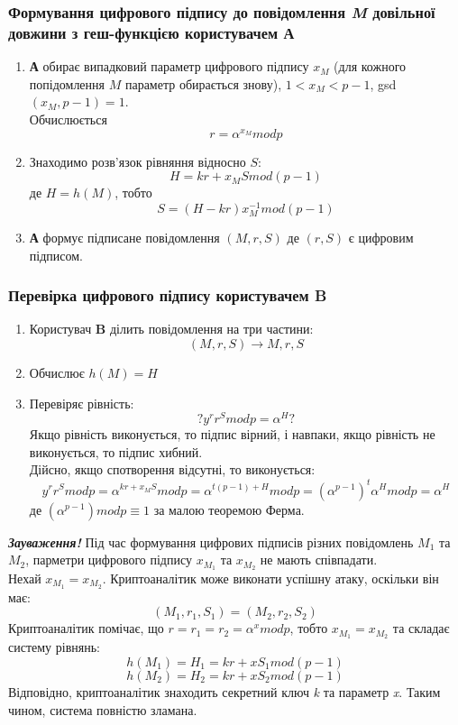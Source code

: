\subsubsection*{Формування цифрового підпису до повідомлення \textit{M} довільної довжини з геш-функцією користувачем \textbf{А}}
\begin{enumerate}
\item \textbf{А} обирає випадковий параметр цифрового підпису \textit{$x_M$} (для кожного попідомлення \textit{$M$} параметр обирається знову), $1<x_M<p-1$, gsd$(x_M,p-1)=1$.\\
 Обчислюється $$r=\alpha^{x_M}modp$$
\item Знаходимо розв'язок рівняння відносно \textit{$S$}: $$H=kr+x_{M}Smod(p-1)$$ 
де $H=h(M)$, тобто $$S=(H-kr)x^{-1}_{M}mod(p-1)$$ 
\item \textbf{А} формує підписане повідомлення \textit{$(M,r,S)$} де \textit{$(r,S)$} є цифровим підписом.
\end{enumerate}
\subsubsection*{Перевірка цифрового підпису користувачем \textbf{B}}
\begin{enumerate}
\item Користувач \textbf{B} ділить повідомлення на три частини:$$(M,r,S)\rightarrow M,r,S$$
\item Обчислює \textit{$h(M)=H$}
\item Перевіряє рівність: $$?y^rr^Smodp=\alpha^H?$$
Якщо рівність виконується, то підпис вірний, і навпаки, якщо рівність не виконується, то підпис хибний.\\
Дійсно, якщо спотворення відсутні, то виконується: $$y^rr^Smodp=\alpha^{kr+x_{M}S}modp=\alpha^{t(p-1)+H}modp=(\alpha^{p-1})^t\alpha^{H}modp=\alpha^{H}$$
де $(\alpha^{p-1})modp\equiv1$ за малою теоремою Ферма.
\end{enumerate}
\textit{\textbf{Зауваження!}} Під час формування цифрових підписів різних повідомлень \textit{$M_1$} та \textit{$M_2$}, парметри цифрового підпису \textit{$x_{M_1}$} та \textit{$x_{M_2}$} не мають співпадати.\\
Нехай \textit{$x_{M_1}=x_{M_2}$}. Криптоаналітик може виконати успішну атаку, оскільки він має: $$(M_1,r_1,S_1)=(M_2,r_2,S_2)$$
Криптоаналітик помічає, що \textit{$r=r_1=r_2=\alpha^{x}modp$}, тобто \textit{$x_{M_1}=x_{M_2}$} та складає систему рівнянь:
$$h(M_1)=H_1=kr+xS_1mod(p-1)$$
$$h(M_2)=H_2=kr+xS_2mod(p-1)$$
Відповідно, криптоаналітик знаходить секретний ключ \textit{k} та параметр \textit{x}. Таким чином, система повністю зламана.
